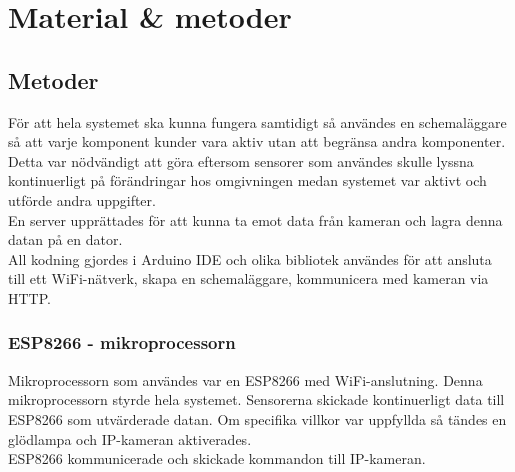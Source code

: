 

\chapter{Material \& metoder} %
\label{ch:metoder}


\ifpdf
    \graphicspath{{8/figures/PNG/}{8/figures/PDF/}{8/figures/}}
\else
    \graphicspath{{8/figures/EPS/}{8/figures/}}
\fi




\section{Metoder}
För att hela systemet ska kunna fungera samtidigt så användes en schemaläggare så att varje komponent kunder vara aktiv utan att begränsa andra komponenter. Detta var nödvändigt att göra eftersom sensorer som användes skulle lyssna kontinuerligt på förändringar hos omgivningen medan systemet var aktivt och utförde andra uppgifter.\\

En server upprättades för att kunna ta emot data från kameran och lagra denna datan på en dator.\\

All kodning gjordes i Arduino IDE och olika bibliotek användes för att ansluta till ett WiFi-nätverk, skapa en schemaläggare, kommunicera med kameran via HTTP.\\ 

\subsection{ESP8266 - mikroprocessorn}
Mikroprocessorn som användes var en ESP8266 med WiFi-anslutning. Denna mikroprocessorn styrde hela systemet. Sensorerna skickade kontinuerligt data till ESP8266 som utvärderade datan. Om specifika villkor var uppfyllda så tändes en glödlampa och IP-kameran aktiverades.\\

ESP8266 kommunicerade och skickade kommandon till IP-kameran.\\

